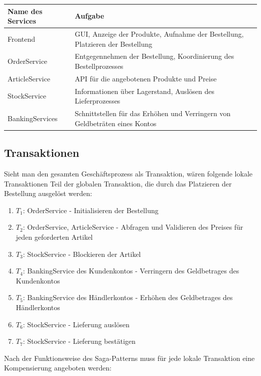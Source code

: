 \begin{center}
	\begin{tabular}[h]{|p{3cm}|p{12cm}|}
		\hline
		Name des Services & Aufgabe \\ \hline
		Frontend & GUI, Anzeige der Produkte, Aufnahme der Bestellung, Platzieren der Bestellung \\ \hline
		OrderService & Entgegennehmen der Bestellung, Koordinierung des Bestellprozesses \\ \hline
		ArticleService & API für die angebotenen Produkte und Preise \\ \hline
		StockService & Informationen über Lagerstand, Auslösen des Lieferprozesses \\ \hline
		BankingServices & Schnittstellen für das Erhöhen und Verringern von Geldbeträten eines Kontos \\ \hline
	\end{tabular}
\end{center}

\subsection{Transaktionen}
Sieht man den gesamten Geschäftsprozess als Transaktion, wären folgende lokale Transaktionen Teil der globalen Transaktion, die durch das Platzieren der Bestellung ausgelöst werden:
\begin{enumerate}
	\item $T_1$: OrderService - Initialisieren der Bestellung
	\item $T_2$: OrderService, ArticleService - Abfragen und Validieren des Preises für jeden geforderten Artikel 
	\item $T_3$: StockService - Blockieren der Artikel
	\item $T_4$: BankingService des Kundenkontos - Verringern des Geldbetrages des Kundenkontos
	\item $T_5$: BankingService des Händlerkontos - Erhöhen des Geldbetrages des Händlerkontos
	\item $T_6$: StockService - Lieferung auslösen
	\item $T_7$: StockService - Lieferung bestätigen
\end{enumerate}

Nach der Funktionsweise des Saga-Patterns muss für jede lokale Transaktion eine Kompensierung angeboten werden:

